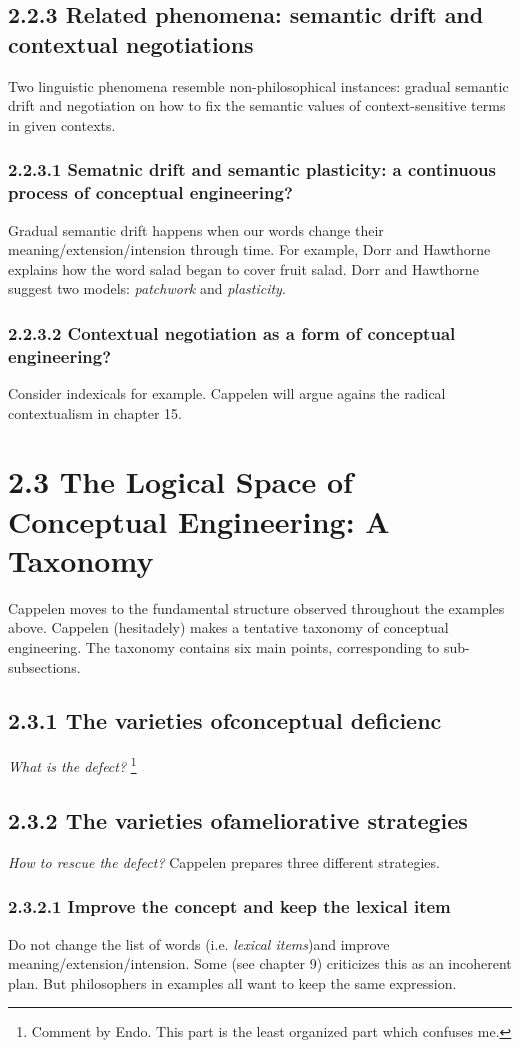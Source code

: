 \documentclass[
10pt, %
a4paper, %
twocolumn, %
landscape %
]{article}
\begin{document}
\subsection*{2.2.3 Related phenomena: semantic drift and contextual negotiations}
Two linguistic phenomena resemble non-philosophical instances: gradual semantic drift and negotiation on how to fix the semantic values of context-sensitive terms in given contexts.

\subsubsection*{2.2.3.1 Sematnic drift and semantic plasticity: a continuous process of conceptual engineering?}
Gradual semantic drift happens when our words change their meaning/extension/intension through time.
For example, Dorr and Hawthorne explains how the word salad began to cover fruit salad. Dorr and Hawthorne suggest two models: \emph{patchwork} and \emph{plasticity}.

\subsubsection*{2.2.3.2 Contextual negotiation as a form of conceptual engineering?}
Consider indexicals for example.
Cappelen will argue agains the radical contextualism in chapter 15.


\section*{2.3 The Logical Space of Conceptual Engineering: A Taxonomy}
Cappelen moves to the fundamental structure observed throughout the examples above.
Cappelen (hesitadely) makes a tentative taxonomy of conceptual engineering. The taxonomy contains six main points, corresponding to sub-subsections.

\subsection*{2.3.1 The varieties ofconceptual deficienc}
\emph{What is the defect?}
\footnote{Comment by Endo. This part is the least organized part which confuses me. }
\subsection*{2.3.2 The varieties ofameliorative strategies}
\emph{How to rescue the defect?} Cappelen prepares three different strategies.
\subsubsection*{2.3.2.1 Improve the concept and keep the lexical item}
Do not change the list of words (i.e. \emph{lexical items})and improve meaning/extension/intension.
Some (see chapter 9) criticizes this as an incoherent plan.
But philosophers in examples all want to keep the same expression.
\end{document}
